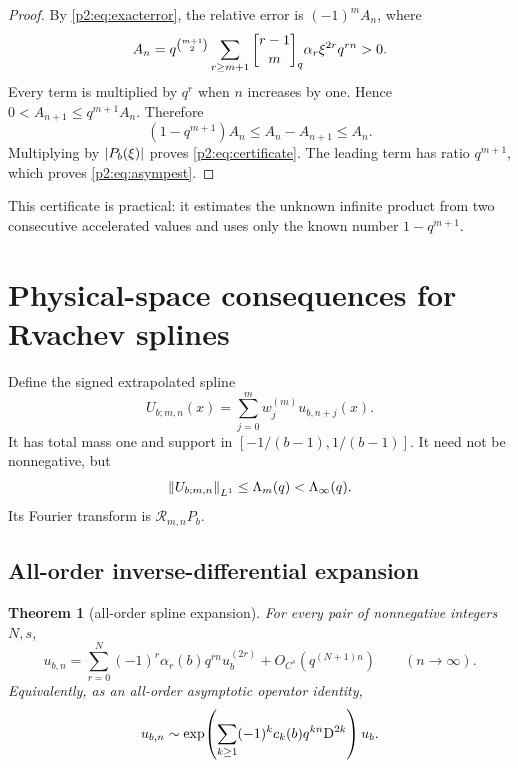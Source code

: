 \documentclass[11pt,oneside]{article}
\numberwithin{equation}{section}
\newtheorem{theorem}{Theorem}[section]
\theoremstyle{definition}
\theoremstyle{remark}
\begin{document}
\begin{proof}
By \eqref{p2:eq:exacterror}, the relative error is \((-1)^mA_n\), where
\[
 A_n=q^{\binom{m+1}{2}}
 \sum_{r\geq m+1}\qbinomPartx{r-1}{m}\alpha_r\xi^{2r}q^{rn}>0.
\]
Every term is multiplied by \(q^r\) when \(n\) increases by one. Hence
\(0<A_{n+1}\leq q^{m+1}A_n\). Therefore
\[
 (1-q^{m+1})A_n\leq A_n-A_{n+1}\leq A_n.
\]
Multiplying by \(\left\lvert P_b(\xi)\right\rvert\) proves \eqref{p2:eq:certificate}. The leading
term has ratio \(q^{m+1}\), which proves \eqref{p2:eq:asympest}.
\end{proof}

This certificate is practical: it estimates the unknown infinite product from
two consecutive accelerated values and uses only the known number
\(1-q^{m+1}\).

\section{Physical-space consequences for Rvachev splines}
\label{p2:sec:physical}

Define the signed extrapolated spline
\begin{equation}
 U_{b;m,n}(x)=\sum_{j=0}^m w_j^{(m)}u_{b,n+j}(x).
 \label{p2:eq:Udef}
\end{equation}
It has total mass one and support in \([-1/(b-1),1/(b-1)]\). It need not be
nonnegative, but
\begin{equation}
 \left\lVert U_{b;m,n}\right\rVert_{L^1}\leq\Lambda_m(q)<\Lambda_\infty(q).
 \label{p2:eq:L1stable}
\end{equation}
Its Fourier transform is \(\mathcal R_{m,n}P_b\).

\subsection{All-order inverse-differential expansion}

\begin{theorem}[all-order spline expansion]
\label{p2:thm:CinftyExpansion}
For every pair of nonnegative integers \(N,s\),
\begin{equation}
 u_{b,n}
 =\sum_{r=0}^{N}(-1)^r\alpha_r(b)q^{rn}u_b^{(2r)}
 +O_{C^s}\!\left(q^{(N+1)n}\right)
 \qquad(n\to\infty).
 \label{p2:eq:physicalExpansion}
\end{equation}
Equivalently, as an all-order asymptotic operator identity,
\begin{equation}
 u_{b,n}\sim
 \exp\!\left(\sum_{k\geq1}(-1)^kc_k(b)q^{kn}\mathrm{D}^{2k}\right)u_b.
 \label{p2:eq:operatorPhysical}
\end{equation}
\end{theorem}
\end{document}
